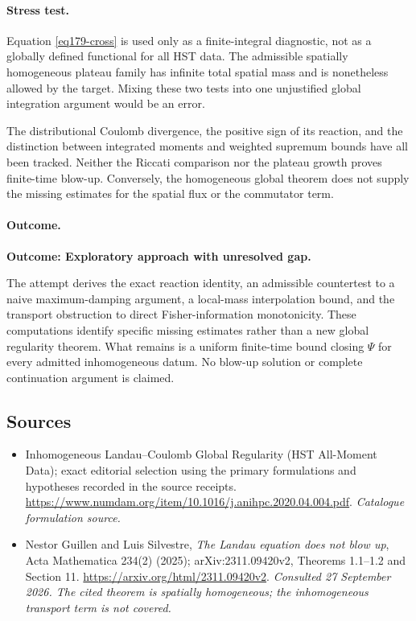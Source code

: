 \documentclass[11pt,a4paper]{article}
\numberwithin{equation}{section}
\begin{document}
\paragraph{Stress test.}
Equation \eqref{eq179-cross} is used only as a finite-integral diagnostic,
not as a globally defined functional for all HST data. The admissible
spatially homogeneous plateau family has infinite total spatial mass and
is nonetheless allowed by the target. Mixing these two tests into one
unjustified global integration argument would be an error.

The distributional Coulomb divergence, the positive sign of its reaction,
and the distinction between integrated moments and weighted supremum
bounds have all been tracked. Neither the Riccati comparison nor the
plateau growth proves finite-time blow-up. Conversely, the homogeneous
global theorem does not supply the missing estimates for the spatial flux
or the commutator term.

\paragraph{Outcome.}
\textbf{Outcome: Exploratory approach with unresolved gap.}

The attempt derives the exact reaction identity, an admissible countertest
to a naive maximum-damping argument, a local-mass interpolation bound, and
the transport obstruction to direct Fisher-information monotonicity.
These computations identify specific missing estimates rather than a new
global regularity theorem. What remains is a uniform finite-time bound
closing $\Psi$ for every admitted inhomogeneous datum. No blow-up solution
or complete continuation argument is claimed.
\subsection{Sources}
\begin{itemize}\raggedright
\item[\textnormal{[S1]}]\hypertarget{source:179:1}{} Inhomogeneous Landau–Coulomb Global Regularity (HST All-Moment Data); exact editorial selection using the primary formulations and hypotheses recorded in the source receipts.
\url{https://www.numdam.org/item/10.1016/j.anihpc.2020.04.004.pdf}.
{\small\textit{Catalogue formulation source.}}
\item[\textnormal{[E1]}]\hypertarget{extra:179:1}{} Nestor Guillen and
Luis Silvestre, \emph{The Landau equation does not blow up},
Acta Mathematica 234(2) (2025); arXiv:2311.09420v2,
Theorems 1.1--1.2 and Section 11.
\url{https://arxiv.org/html/2311.09420v2}.
{\small\textit{Consulted 27 September 2026. The cited theorem is
spatially homogeneous; the inhomogeneous transport term is not covered.}}
\end{itemize}
\end{document}

